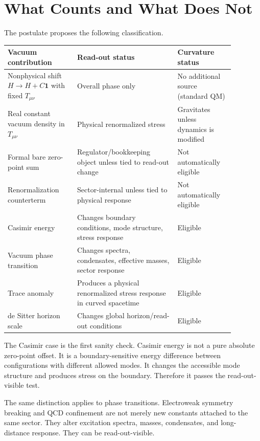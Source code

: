 \documentclass[12pt,a4paper]{article}
\theoremstyle{definition}
\theoremstyle{remark}
\begin{document}
\section{What Counts and What Does Not}
\label{sec:classification}

The postulate proposes the following classification.

\begin{center}
\begin{tabular}{P{0.27\linewidth}P{0.39\linewidth}P{0.22\linewidth}}
\toprule
\textbf{Vacuum contribution} & \textbf{Read-out status} & \textbf{Curvature status} \\
\midrule
Nonphysical shift $H\to H+C\mathbf1$ with fixed $T_{\mu\nu}$ & Overall phase only & No additional source (standard QM) \\
Real constant vacuum density in $T_{\mu\nu}$ & Physical renormalized stress & Gravitates unless dynamics is modified \\
Formal bare zero-point sum & Regulator/bookkeeping object unless tied to read-out change & Not automatically eligible \\
Renormalization counterterm & Sector-internal unless tied to physical response & Not automatically eligible \\
Casimir energy & Changes boundary conditions, mode structure, stress response & Eligible \\
Vacuum phase transition & Changes spectra, condensates, effective masses, sector response & Eligible \\
Trace anomaly & Produces a physical renormalized stress response in curved spacetime & Eligible \\
de Sitter horizon scale & Changes global horizon/read-out conditions & Eligible \\
\bottomrule
\end{tabular}
\end{center}

The Casimir case is the first sanity check. Casimir energy is not a pure absolute zero-point offset. It is a boundary-sensitive energy difference between configurations with different allowed modes. It changes the accessible mode structure and produces stress on the boundary. Therefore it passes the read-out-visible test.

The same distinction applies to phase transitions. Electroweak symmetry breaking and QCD confinement are not merely new constants attached to the same sector. They alter excitation spectra, masses, condensates, and long-distance response. They can be read-out-visible.
\end{document}
